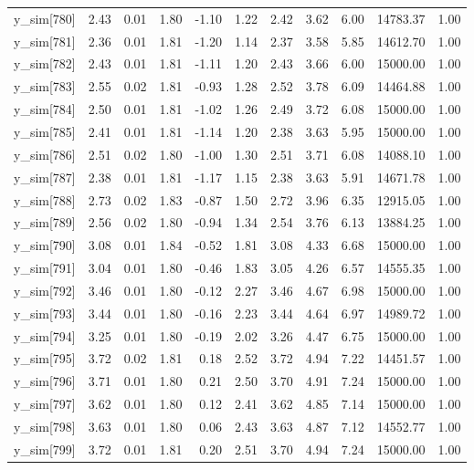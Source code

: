 \begin{table}[ht]
\begin{tabular}{rrrrrrrrrrr}
  y\_sim[780] & 2.43 & 0.01 & 1.80 & -1.10 & 1.22 & 2.42 & 3.62 & 6.00 & 14783.37 & 1.00 \\ 
  y\_sim[781] & 2.36 & 0.01 & 1.81 & -1.20 & 1.14 & 2.37 & 3.58 & 5.85 & 14612.70 & 1.00 \\ 
  y\_sim[782] & 2.43 & 0.01 & 1.81 & -1.11 & 1.20 & 2.43 & 3.66 & 6.00 & 15000.00 & 1.00 \\ 
  y\_sim[783] & 2.55 & 0.02 & 1.81 & -0.93 & 1.28 & 2.52 & 3.78 & 6.09 & 14464.88 & 1.00 \\ 
  y\_sim[784] & 2.50 & 0.01 & 1.81 & -1.02 & 1.26 & 2.49 & 3.72 & 6.08 & 15000.00 & 1.00 \\ 
  y\_sim[785] & 2.41 & 0.01 & 1.81 & -1.14 & 1.20 & 2.38 & 3.63 & 5.95 & 15000.00 & 1.00 \\ 
  y\_sim[786] & 2.51 & 0.02 & 1.80 & -1.00 & 1.30 & 2.51 & 3.71 & 6.08 & 14088.10 & 1.00 \\ 
  y\_sim[787] & 2.38 & 0.01 & 1.81 & -1.17 & 1.15 & 2.38 & 3.63 & 5.91 & 14671.78 & 1.00 \\ 
  y\_sim[788] & 2.73 & 0.02 & 1.83 & -0.87 & 1.50 & 2.72 & 3.96 & 6.35 & 12915.05 & 1.00 \\ 
  y\_sim[789] & 2.56 & 0.02 & 1.80 & -0.94 & 1.34 & 2.54 & 3.76 & 6.13 & 13884.25 & 1.00 \\ 
  y\_sim[790] & 3.08 & 0.01 & 1.84 & -0.52 & 1.81 & 3.08 & 4.33 & 6.68 & 15000.00 & 1.00 \\ 
  y\_sim[791] & 3.04 & 0.01 & 1.80 & -0.46 & 1.83 & 3.05 & 4.26 & 6.57 & 14555.35 & 1.00 \\ 
  y\_sim[792] & 3.46 & 0.01 & 1.80 & -0.12 & 2.27 & 3.46 & 4.67 & 6.98 & 15000.00 & 1.00 \\ 
  y\_sim[793] & 3.44 & 0.01 & 1.80 & -0.16 & 2.23 & 3.44 & 4.64 & 6.97 & 14989.72 & 1.00 \\ 
  y\_sim[794] & 3.25 & 0.01 & 1.80 & -0.19 & 2.02 & 3.26 & 4.47 & 6.75 & 15000.00 & 1.00 \\ 
  y\_sim[795] & 3.72 & 0.02 & 1.81 & 0.18 & 2.52 & 3.72 & 4.94 & 7.22 & 14451.57 & 1.00 \\ 
  y\_sim[796] & 3.71 & 0.01 & 1.80 & 0.21 & 2.50 & 3.70 & 4.91 & 7.24 & 15000.00 & 1.00 \\ 
  y\_sim[797] & 3.62 & 0.01 & 1.80 & 0.12 & 2.41 & 3.62 & 4.85 & 7.14 & 15000.00 & 1.00 \\ 
  y\_sim[798] & 3.63 & 0.01 & 1.80 & 0.06 & 2.43 & 3.63 & 4.87 & 7.12 & 14552.77 & 1.00 \\ 
  y\_sim[799] & 3.72 & 0.01 & 1.81 & 0.20 & 2.51 & 3.70 & 4.94 & 7.24 & 15000.00 & 1.00 \\ 

\end{tabular}
\end{table}
